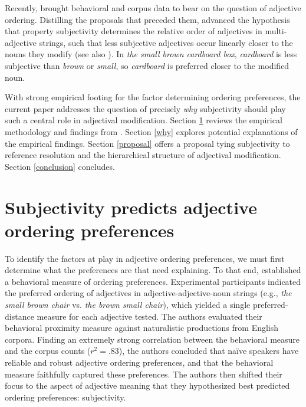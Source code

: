 \documentclass{sp}
\begin{document}
Recently, \cite{scontrasetal2017adjectives} brought behavioral and corpus data to bear on the question of adjective ordering. Distilling the proposals that preceded them, \citeauthor{scontrasetal2017adjectives} advanced the hypothesis that property subjectivity determines the relative order of adjectives in multi-adjective strings, such that less subjective adjectives occur linearly closer to the nouns they modify (see also \citealp{hetzron1978,tucker1998,hill2012}). In \emph{the small brown cardboard box}, \emph{cardboard} is less subjective than \emph{brown} or \emph{small}, so \emph{cardboard} is preferred closer to the modified noun.

With strong empirical footing for the factor determining ordering preferences, the current paper addresses the question of precisely \emph{why} subjectivity should play such a central role in adjectival modification. Section \ref{review} reviews the empirical methodology and findings from \cite{scontrasetal2017adjectives}. Section \ref{why} explores potential explanations of the empirical findings. Section \ref{proposal} offers a proposal tying subjectivity to reference resolution and the hierarchical structure of adjectival modification. Section \ref{conclusion} concludes.


\section{Subjectivity predicts adjective ordering preferences} \label{review}

To identify the factors at play in adjective ordering preferences, we must first determine what the preferences are that need explaining. To that end, \cite{scontrasetal2017adjectives} established a behavioral measure of ordering preferences. Experimental participants indicated the preferred ordering of adjectives in adjective-adjective-noun strings (e.g., \emph{the small brown chair} vs. \emph{the brown small chair}), which yielded a single preferred-distance measure for each adjective tested. 
The authors evaluated their behavioral proximity measure against naturalistic productions from English corpora. Finding an extremely strong correlation between the behavioral measure and the corpus counts ($r^2 = .83$), the authors concluded that na\"ive speakers have reliable and robust adjective ordering preferences, and that the behavioral measure faithfully captured these preferences. The authors then shifted their focus to the aspect of adjective meaning that they hypothesized best predicted ordering preferences: subjectivity. 
\end{document}
